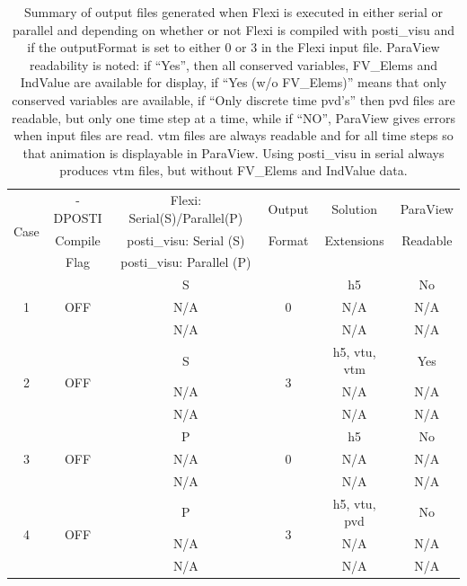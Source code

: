 \begin{appendices}
\begin{table}[h!]
 \centering
 \tiny
 \caption{Summary of output files generated when Flexi is executed in either serial or parallel and depending on whether or not Flexi is compiled with posti\_visu and if the outputFormat is set to either 0 or 3 in the Flexi input file. ParaView readability is noted: if ``Yes'', then all conserved variables, FV\_Elems and IndValue are available for display, if ``Yes (w/o FV\_Elems)'' means that only conserved variables are available, if ``Only discrete time pvd's'' then pvd files are readable, but only one time step at a time, while if ``NO'', ParaView gives errors when input files are read. vtm files are always readable and for all time steps so that animation is displayable in ParaView. Using posti\_visu in serial always produces vtm files, but without FV\_Elems and IndValue data.}\label{tab:cases}
 \begin{tabular}{|c|c|c|c|c|c|} \hline
  \multirow{3}{*}{Case} & -DPOSTI & Flexi: Serial(S)/Parallel(P) & Output & Solution & ParaView \\ \cline{3-3}
   & Compile & posti\_visu: Serial (S) & Format & Extensions & Readable \\
   & Flag & posti\_visu: Parallel (P)&  & & \\ \hline
 \multirow{3}{*}{1} & \multirow{3}{*}{OFF} & S & \multirow{3}{*}{0} & h5 & No \\ \cline{3-3} \cline{5-6}
    &  &  N/A & & N/A & N/A \\
    &  &  N/A & & N/A & N/A \\ \hline

 \multirow{3}{*}{2} & \multirow{3}{*}{OFF} & S & \multirow{3}{*}{3} & h5, vtu, vtm & Yes \\ \cline{3-3} \cline{5-6}
     &  &  N/A & & N/A & N/A \\
    &  &  N/A & & N/A & N/A \\ \hline

 \multirow{3}{*}{3} & \multirow{3}{*}{OFF} & P & \multirow{3}{*}{0} & h5 & No \\ \cline{3-3} \cline{5-6}
    &  &  N/A & & N/A & N/A \\
    &  &  N/A & & N/A & N/A \\ \hline

 \multirow{3}{*}{4} & \multirow{3}{*}{OFF} & P & \multirow{3}{*}{3} & h5, vtu, pvd & No \\ \cline{3-3} \cline{5-6}
   &  &  N/A & & N/A & N/A \\
    &  &  N/A & & N/A & N/A \\ \hline


\end{tabular}
\end{table}
\end{appendices}
